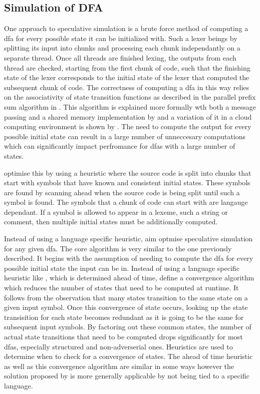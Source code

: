 \subsection{Simulation of DFA} \label{simulation_of_dfa}

One approach to speculative simulation is a brute force method of computing
a \gls{dfa} for every possible state it can be initialized with. Such a
lexer beings by splitting its input into chunks and processing each chunk
independantly on a separate thread. Once all threads are finished lexing,
the outputs from each thread are checked, starting from the first chunk of
code, such that the finishing state of the lexer corresponds to the initial
state of the lexer that computed the subsequent chunk of code. The correctness
of computing a \gls{dfa} in this way relies on the  associativity of state
transition functions as described in the parallel prefix sum algorithm in
\cite{hillis_data_1986}. This algorithm is explained more formally wth both a
message passing and a shared memory implementation by \cite{holub_parallel_2009}
and a variation of it in a cloud computing environment is shown by
\cite{ko_speculative_2012}. The need to compute the output for every possible
initial state can result in a large number of unneccesary computations which can
significantly impact perfromance for \glspl{dfa} with a large number of states.

\cite{barenghi_parallel_2015} optimise this by using a heuristic where the
source code is split into chunks that start with symbols that have known and
consistent initial states. These symbols are found by scanning ahead when the
source code is being split until such a symbol is found. The symbols that a
chunk of code can start with are langauge dependant. If a symbol is allowed to
appear in a lexeme, such a string or comment, then multiple initial states must
be additionally computed.

Instead of using a language specific heuristic,
\cite{mytkowicz_data-parallel_2014} aim optmise speculative simulation for
any given \gls{dfa}. The core algorithm is very similar to the one previously
described. It begins with the assumption of needing to compute the \gls{dfa} for
every possible initial state the input can be in. Instead of using a language
specific heuristic like \cite{barenghi_parallel_2015}, which is determined ahead
of time, \cite{mytkowicz_data-parallel_2014} define a convergence algorithm
which reduces the number of states that need to be computed at runtime. It
follows from the observation that many states transition to the same state on a
given input symbol. Once this convergence of state occurs, looking up the state
transisition for each state becomes redundant as it is going to be the same
for subsequent input symbols. By factoring out these common states, the number
of actual state transitions that need to be computed drops significantly for
most \gls{dfa}s, especially structured and non-adverserial ones. Heuristics are
used to determine when to check for a  convergence of states. The ahead of time
heuristic as well as this convergence algorithm are similar in some ways however
the solution proposed by \cite{mytkowicz_data-parallel_2014} is more generally
applicable by not being tied to a specific language.

